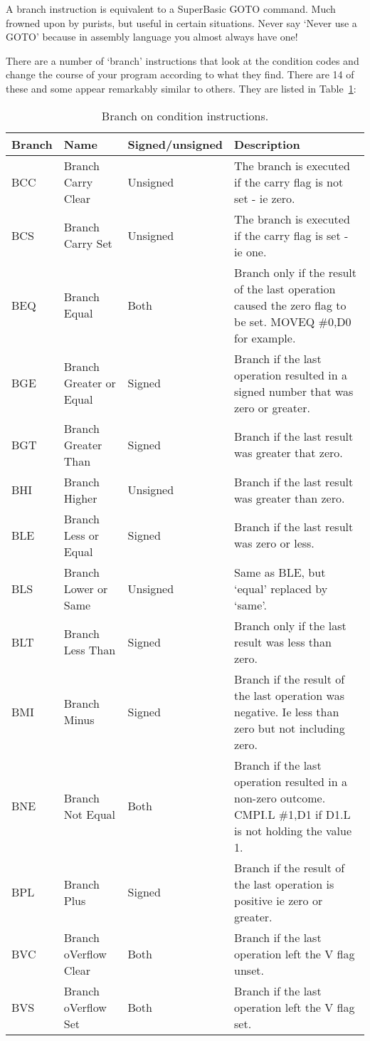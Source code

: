 A branch instruction is equivalent to a SuperBasic GOTO command. Much frowned upon
by purists, but useful in certain situations. Never say `Never use a GOTO' because in
assembly language you almost always have one!

There are a number of `branch' instructions that look at the
    condition codes and change the course of your program according to what
    they find. There are 14 of these and some appear remarkably similar to
    others. They are listed in Table~\ref{tab:BranchOnConditionInstructions}:

\begin{table}[htbp]
\centering
\begin{tabular}{l l l p{}}
\toprule
\textbf{Branch} & \textbf{Name} & \textbf{Signed/unsigned} & \textbf{Description}\\
\midrule
BCC & Branch Carry Clear      & Unsigned & The branch is executed if the carry flag is not set -{} ie zero.\\
BCS & Branch Carry Set        & Unsigned & The branch is executed if the carry flag is set -{} ie one.\\
BEQ & Branch Equal            & Both     & Branch only if the result of the last operation caused the zero flag to be set. MOVEQ \#0,D0 for example.\\
BGE & Branch Greater or Equal & Signed   & Branch if the last operation resulted in a signed number that was zero or greater.\\
BGT & Branch Greater Than     & Signed   & Branch if the last result was greater that zero.\\
BHI & Branch Higher           & Unsigned & Branch if the last result was greater than zero.\\
BLE & Branch Less or Equal    & Signed   & Branch if the last result was zero or less.\\
BLS & Branch Lower or Same    & Unsigned & Same as BLE, but `equal' replaced by `same'.\\
BLT & Branch Less Than        & Signed   & Branch only if the last result was less than zero.\\
BMI & Branch Minus            & Signed   & Branch if the result of the last operation was negative. Ie less than zero but not including zero.\\
BNE & Branch Not Equal        & Both     & Branch if the last operation resulted in a non-{}zero outcome. CMPI.L \#1,D1 if D1.L is not holding the value 1.\\
BPL & Branch Plus             & Signed   & Branch if the result of the last operation is positive ie zero or greater.\\
BVC & Branch oVerflow Clear   & Both     & Branch if the last operation left the V flag unset.\\
BVS & Branch oVerflow Set     & Both     & Branch if the last operation left the V flag set.\\
\bottomrule
\end{tabular}
\caption{Branch on condition instructions.}
\label{tab:BranchOnConditionInstructions}
\end{table}

